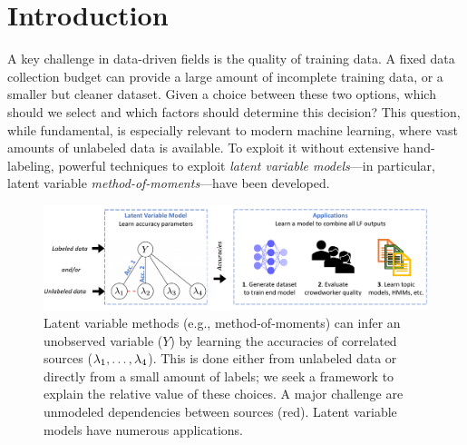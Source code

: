  \section{Introduction}

A key challenge in data-driven fields is the quality of training data. A fixed data collection budget can
provide a large amount of incomplete training data, or a smaller but cleaner dataset. Given a choice between these two options, which should we select and which factors should determine this decision? This question, while fundamental, is especially
relevant to modern machine learning, where vast amounts of unlabeled data is available. To exploit it without extensive hand-labeling, powerful techniques to exploit \emph{latent variable models}---in particular, latent variable \emph{method-of-moments}---have been developed. 


\begin{figure}
    \centering
    \includegraphics[width=.8\textwidth]{figures/maindiagram.pdf}
    \caption{Latent variable methods (e.g., method-of-moments) can infer an unobserved variable ($Y$) by learning the accuracies of correlated sources ($\lambda_1, \ldots, \lambda_4$). This is done either from unlabeled data or directly from a small amount of labels; we seek a framework to explain the relative value of these choices. A major challenge are unmodeled dependencies between sources (red). Latent variable models have numerous applications.}
    \label{fig:systemdiagram}
\end{figure}

